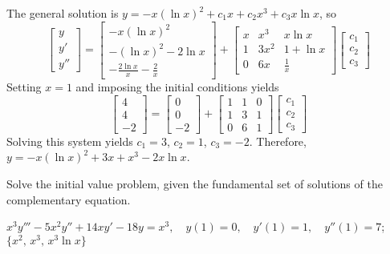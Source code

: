 \documentclass{ximera}
\begin{document}
\begin{problem}
\begin{solution}
The general solution is $y=-x(\ln x)^2+c_1x+c_2x^3+c_3x\ln x$,
so
$$
\left[\begin{array}{l}y\\y'\\y''
\end{array}\right]=
\left[\begin{array}{c}
-x(\ln x)^2\\ -(\ln x)^2-2\ln x\\-\frac{2\ln x}{x}-\frac{2}{x}
\end{array}\right]+
\left[\begin{array}{cccc}
x&x^3&x\ln x\\1&3x^2&1+\ln x\\0&6x&\frac{1}{x}
\end{array}\right]
\left[\begin{array}{ccccccc}
c_{1}\\ c_{2}\\ c_{3}
\end{array}\right]
$$
Setting $x=1$ and imposing the initial conditions yields
$$
\left[\begin{array}{ccccccc}
4\\ 4\\ -2
\end{array}\right]
=
\left[\begin{array}{ccccccc}
0\\ 0\\ -2
\end{array}\right]
+
\left[\begin{array}{ccc}
1&1&0\\ 1&3&1\\0&6&1
\end{array}\right]
\left[\begin{array}{ccccccc}
c_{1}\\ c_{2}\\ c_{3}
\end{array}\right]
$$
Solving this system yields $c_1=3$, $c_2=1$, $c_3=-2$.
Therefore,$y=-x(\ln x)^2+3x+x^3-2x\ln x$.
\end{solution}
\end{problem}

\begin{problem}\label{exer:9.4.23}
Solve the
initial value problem, given the fundamental set of solutions of the complementary equation.

$x^3y'''-5x^2y''+14xy'-18y=x^3, \quad  y(1)=0,\quad y'(1)=1,\quad
y''(1)=7$;
\quad $\{x^2,\, x^3,\,x^3 \ln x\}$
\end{problem}
\end{document}
